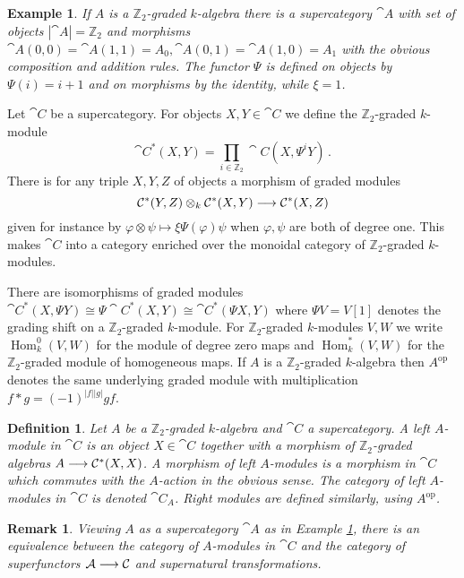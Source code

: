 \documentclass[english,letter paper,12pt,leqno]{article}
\theoremstyle{example}
\newtheorem{definition}[theorem]{Definition}
\newtheorem{example}[theorem]{Example}
\newtheorem{remark}[theorem]{Remark}
\numberwithin{equation}{section}
\def\Hom{\operatorname{Hom}}
\begin{document}
\begin{example}\label{example:Aassup} If $A$ is a $\mathbb{Z}_2$-graded $k$-algebra there is a supercategory $\cat{A}$ with set of objects $|\cat{A}| = \mathbb{Z}_2$ and morphisms $\cat{A}(0,0) = \cat{A}(1,1) = A_0, \cat{A}(0,1) = \cat{A}(1,0) = A_1$ with the obvious composition and addition rules. The functor $\Psi$ is defined on objects by $\Psi(i) = i+1$ and on morphisms by the identity, while $\xi = 1$.
\end{example}

Let $\cat{C}$ be a supercategory. For objects $X,Y \in \cat{C}$ we define the $\mathbb{Z}_2$-graded $k$-module
\[
\cat{C}^*(X,Y) = \prod_{i \in \mathbb{Z}_2} \cat{C}(X, \Psi^i Y)\,.
\]
There is for any triple $X,Y,Z$ of objects a morphism of graded modules
\[
\mathcal{C}^*(Y,Z) \otimes_k \mathcal{C}^*(X, Y) \longrightarrow \mathcal{C}^*(X,Z)
\]
given for instance by $\varphi \otimes \psi \mapsto \xi \Psi( \varphi ) \psi$ when $\varphi, \psi$ are both of degree one. This makes $\cat{C}$ into a category enriched over the monoidal category of $\mathbb{Z}_2$-graded $k$-modules.

There are isomorphisms of graded modules $\cat{C}^*(X, \Psi Y) \cong \Psi \cat{C}^*(X, Y) \cong \cat{C}^*(\Psi X, Y)$ where $\Psi V = V [1]$ denotes the grading shift on a $\mathbb{Z}_2$-graded $k$-module. For $\mathbb{Z}_2$-graded $k$-modules $V,W$ we write $\Hom^0_k(V, W)$ for the module of degree zero maps and $\Hom_k^*(V, W)$ for the $\mathbb{Z}_2$-graded module of homogeneous maps. If $A$ is a $\mathbb{Z}_2$-graded $k$-algebra then $A^{\operatorname{op}}$ denotes the same underlying graded module with multiplication $f * g = (-1)^{|f||g|} gf$.

\begin{definition} Let $A$ be a $\mathbb{Z}_2$-graded $k$-algebra and $\cat{C}$ a supercategory. A \emph{left $A$-module in $\cat{C}$} is an object $X \in \cat{C}$ together with a morphism of $\mathbb{Z}_2$-graded algebras $A \longrightarrow \mathcal{C}^*(X,X)$. A \emph{morphism} of left $A$-modules is a morphism in $\cat{C}$ which commutes with the $A$-action in the obvious sense. The category of left $A$-modules in $\cat{C}$ is denoted $\cat{C}_A$. Right modules are defined similarly, using $A^{\operatorname{op}}$.
\end{definition}

\begin{remark}\label{remark:supercat_idempcomp} Viewing $A$ as a supercategory $\cat{A}$ as in Example \ref{example:Aassup}, there is an equivalence between the category of $A$-modules in $\cat{C}$ and the category of superfunctors $\mathcal{A} \longrightarrow \mathcal{C}$ and supernatural transformations.
\end{remark}
\end{document}
